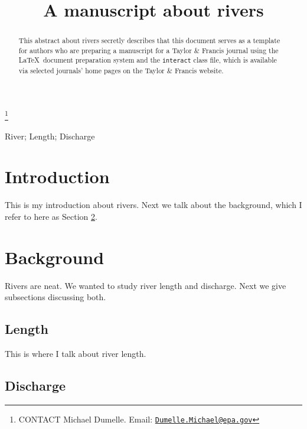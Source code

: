 \documentclass[]{interact}
\theoremstyle{plain}%
\theoremstyle{definition}
\theoremstyle{remark}
\begin{document}
\articletype{}

\title{A manuscript about rivers}


\author{
}

\thanks{CONTACT Michael Dumelle. Email: \href{mailto:Dumelle.Michael@epa.gov}{\nolinkurl{Dumelle.Michael@epa.gov}}}

\maketitle

\begin{abstract}
This abstract about rivers secretly describes that this document serves
as a template for authors who are preparing a manuscript for a Taylor \&
Francis journal using the \LaTeX~document preparation system and the
\texttt{interact} class file, which is available via selected journals'
home pages on the Taylor \& Francis website.
\end{abstract}

\begin{keywords}
River; Length; Discharge
\end{keywords}

\hypertarget{intro}{%
\section{Introduction}\label{intro}}

This is my introduction about rivers. Next we talk about the background,
which I refer to here as Section \ref{background}.

\hypertarget{background}{%
\section{Background}\label{background}}

Rivers are neat. We wanted to study river length and discharge. Next we
give subsections discussing both.

\hypertarget{subsec:length}{%
\subsection{Length}\label{subsec:length}}

This is where I talk about river length.

\hypertarget{subsec:discharge}{%
\subsection{Discharge}\label{subsec:discharge}}
\end{document}
